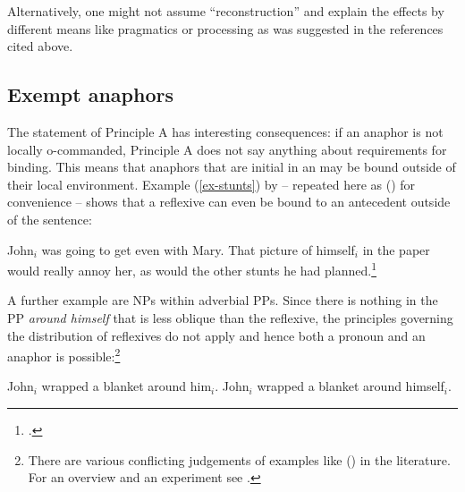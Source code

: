 \documentclass[output=paper,biblatex,babelshorthands,newtxmath,draftmode,colorlinks,citecolor=brown]{langscibook}
\begin{document}
{Alternatively, one might not assume ``reconstruction'' and explain the effects by different means
like pragmatics or processing as was suggested in the references cited above.
}

\subsection{Exempt anaphors}
\label{sec-excempt-anaphors}\label{binding:sec-excempt-anaphors}


The statement of Principle A has interesting consequences: if an anaphor is not locally o-commanded,
Principle A does not say anything about requirements for binding. This means that anaphors that are
initial in an \argstl may be bound outside of their local environment. Example (\ref{ex-stunts}) by
\citet[]{ps2} -- repeated here as () for convenience -- shows that a reflexive can even be bound to an antecedent outside of the sentence:

\eanoraggedright
John$_i$ was going to get even with Mary. That picture of himself$_i$
in the paper would really annoy her, as would the other stunts he had planned.\footnote{
        .
}
\z

\noindent
A further example are NPs within adverbial PPs. Since there is nothing in the PP \emph{around
  himself} that is less oblique than the reflexive, the principles governing the distribution of
reflexives do not apply and hence both a pronoun and an anaphor is possible:\footnote{
  There are various conflicting judgements of examples like () in the literature. For an
  overview and an experiment see .
}

\eal
\label{ex-john-wrapped-a-blanket-around-him}
\ex John$_i$ wrapped a blanket around him$_i$.
\ex John$_i$ wrapped a blanket around himself$_i$.
\zl
{}
\end{document}
